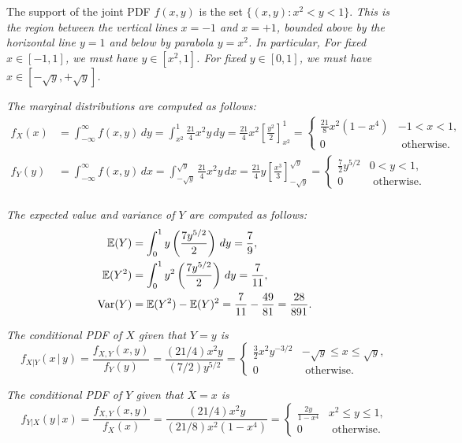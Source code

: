 \begin{solution}
The support of the joint PDF $f(x,y)$ is the set $\{(x,y): x^2 < y < 1\}$. 
\bit
\it This is the region between the vertical lines $x=-1$ and $x=+1$, bounded above by the horizontal line $y=1$ and below by parabola $y=x^2$.
\eit
In particular,
\bit
\it For fixed $x\in[-1,1]$, we must have $y\in[x^2,1]$.
\it For fixed $y\in[0,1]$, we must have $x\in[-\sqrt{y},+\sqrt{y}]$.
\eit
 
\ben
\it %
The marginal distributions are computed as follows:
\begin{align*}
f_X(x) 	
	& = \int_{-\infty}^{\infty} f(x,y)\,dy 
	= \int_{x^2}^1 \frac{21}{4}x^2y\,dy 
	= \frac{21}{4}x^2\left[\frac{y^2}{2}\right]_{x^2}^1 
	= \begin{cases} \frac{21}{8}x^2(1-x^4)	& -1<x<1, \\ 0 & \text{ otherwise.}\end{cases} \\
f_Y(y) 	
	& = \int_{-\infty}^{\infty} f(x,y)\,dx 
	= \int_{-\sqrt{y}}^{\sqrt{y}} \frac{21}{4}x^2y\,dx 
	= \frac{21}{4}y\left[\frac{x^3}{3}\right]_{-\sqrt{y}}^{\sqrt{y}}
	= \begin{cases} \frac{7}{2}y^{5/2} & 0< y< 1, \\ 0 & \text{ otherwise.}\end{cases} \\
\end{align*}

\it %
The expected value and variance of $Y$ are computed as follows:
\begin{align*}
\mathbb{E}(Y)
	& = \int_0^1 y\left(\frac{7y^{5/2}}{2}\right)\,dy = \frac{7}{9}, \\
\mathbb{E}(Y^2)
	& = \int_0^1 y^2\left(\frac{7y^{5/2}}{2}\right)\,dy = \frac{7}{11}, \\
\text{Var}(Y)
	& = \mathbb{E}(Y^2) - \mathbb{E}(Y)^2 = \frac{7}{11} - \frac{49}{81} = \frac{28}{891}.
\end{align*}

\it %
The conditional PDF of $X$ given that $Y=y$ is
\[
f_{X|Y}(x\,|\,y)
	= \frac{f_{X,Y}(x,y)}{f_Y(y)} 
	= \frac{(21/4)x^2y}{(7/2)y^{5/2}} 		
	= \begin{cases} 
		\displaystyle\frac{3}{2}x^2y^{-3/2}	& -\sqrt{y}\leq x\leq \sqrt{y}, \\
		0 										& \text{ otherwise.}
	\end{cases}
\]

\it %
The conditional PDF of $Y$ given that $X=x$ is
\[
f_{Y|X}(y\,|\,x) 	
	= \frac{f_{X,Y}(x,y)}{f_X(x)} 
	= \frac{(21/4)x^2y}{(21/8)x^2(1-x^4)} 	
	= \begin{cases} 
		\displaystyle\frac{2y}{1-x^4} 	& x^2\leq y\leq 1, \\
	 	0 									& \text{ otherwise}.
	 \end{cases}
\]	 


\end{solution}
